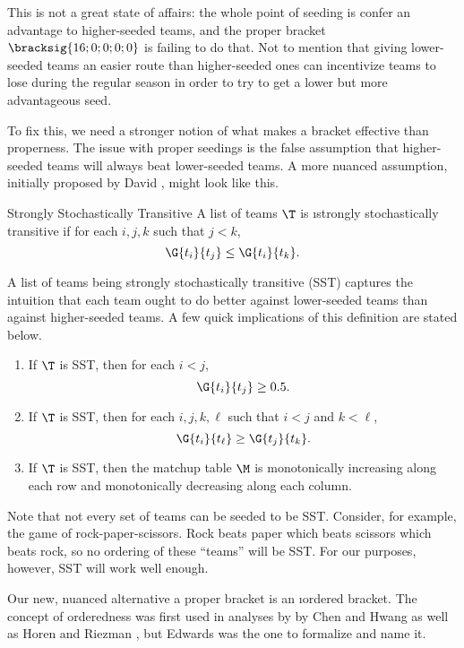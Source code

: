 {This is not a great state of affairs: the whole point of seeding is confer an advantage to higher-seeded teams, and the proper bracket $\bracksig{16; 0; 0; 0; 0}$ is failing to do that. Not to mention that giving lower-seeded teams an easier route than higher-seeded ones can incentivize teams to lose during the regular season in order to try to get a lower but more advantageous seed.

To fix this, we need a stronger notion of what makes a bracket effective than properness. The issue with proper seedings is the false assumption that higher-seeded teams will always beat lower-seeded teams. A more nuanced assumption, initially proposed by David \cite{stochastic}, might look like this. %

\begin{definition}{Strongly Stochastically Transitive}{}
    A list of teams $\T$ is \i{strongly stochastically transitive} if for each $i, j, k$ such that $j < k$, $$\G{t_i}{t_j} \leq \G{t_i}{t_k}.$$
\end{definition}

A list of teams being strongly stochastically transitive (SST) captures the intuition that each team ought to do better against lower-seeded teams than against higher-seeded teams. A few quick implications of this definition are stated below.

\begin{corollary}{}{}
    \begin{enumerate}[(1)]
        \item If $\T$ is SST, then for each $i < j$, $$\G{t_i}{t_j} \geq 0.5.$$
        \item If $\T$ is SST, then for each $i, j, k, \ell$ such that $i < j$ and $k < \ell$, $$\G{t_i}{t_\ell} \geq \G{t_j}{t_k}.$$
        \item If $\T$ is SST, then the matchup table $\M$ is monotonically increasing along each row and monotonically decreasing along each column.
    \end{enumerate}
    \end{corollary}

Note that not every set of teams can be seeded to be SST. Consider, for example, the game of rock-paper-scissors. Rock beats paper which beats scissors which beats rock, so no ordering of these ``teams'' will be SST. For our purposes, however, SST will work well enough.

Our new, nuanced alternative a proper bracket is an \i{ordered bracket}. The concept of orderedness was first used in analyses by by Chen and Hwang \cite{define_ordered} as well as Horen and Riezman \cite{four_eight_ordered}, but Edwards \cite{montana} was the one to formalize and name it.

}
